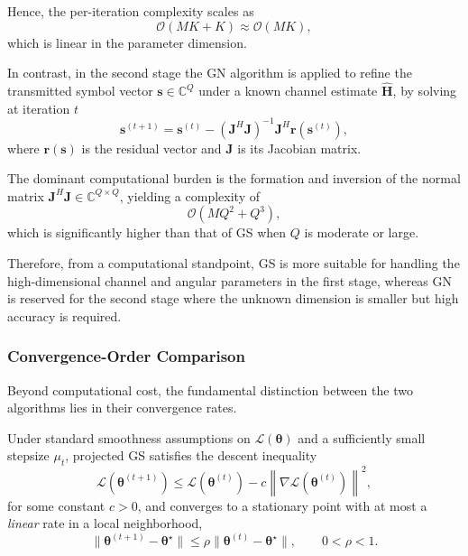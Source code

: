 \documentclass[journal]{IEEEtran}
\begin{document}
Hence, the per-iteration complexity scales as
\begin{equation}
\mathcal{O}\!\left(MK + K\right)
\approx
\mathcal{O}(MK),
\end{equation}
which is linear in the parameter dimension.

In contrast, in the second stage the GN algorithm is applied to refine the transmitted symbol vector $\mathbf{s}\in\mathbb{C}^{Q}$ under a known channel estimate $\widehat{\mathbf{H}}$, by solving at iteration $t$
\begin{equation}
\mathbf{s}^{(t+1)}
=
\mathbf{s}^{(t)}
-
\left(
\mathbf{J}^H \mathbf{J}
\right)^{-1}
\mathbf{J}^H
\mathbf{r}(\mathbf{s}^{(t)}),
\end{equation}
where $\mathbf{r}(\mathbf{s})$ is the residual vector and $\mathbf{J}$ is its Jacobian matrix.

The dominant computational burden is the formation and inversion of the normal matrix $\mathbf{J}^H\mathbf{J}\in\mathbb{C}^{Q\times Q}$, yielding a complexity of
\begin{equation}
\mathcal{O}\!\left(MQ^2 + Q^3\right),
\end{equation}
which is significantly higher than that of GS when $Q$ is moderate or large.

Therefore, from a computational standpoint, GS is more suitable for handling the high-dimensional channel and angular parameters in the first stage, whereas GN is reserved for the second stage where the unknown dimension is smaller but high accuracy is required.

\subsubsection*{Convergence-Order Comparison}

Beyond computational cost, the fundamental distinction between the two algorithms lies in their convergence rates.

Under standard smoothness assumptions on $\mathcal{L}(\boldsymbol{\theta})$ and a sufficiently small stepsize $\mu_t$, projected GS satisfies the descent inequality
\begin{equation}
\mathcal{L}(\boldsymbol{\theta}^{(t+1)})
\le
\mathcal{L}(\boldsymbol{\theta}^{(t)})
-
c
\left\|
\nabla \mathcal{L}(\boldsymbol{\theta}^{(t)})
\right\|^2,
\end{equation}
for some constant $c>0$, and converges to a stationary point with at most a \emph{linear} rate in a local neighborhood,
\begin{equation}
\|
\boldsymbol{\theta}^{(t+1)}-\boldsymbol{\theta}^\star
\|
\le
\rho
\|
\boldsymbol{\theta}^{(t)}-\boldsymbol{\theta}^\star
\|,
\qquad
0<\rho<1.
\end{equation}
\end{document}
